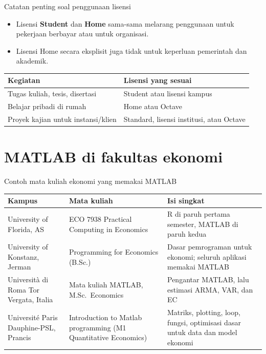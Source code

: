 \documentclass[aspectratio=169,11pt]{beamer}
\begin{document}
\begin{frame}{Catatan penting soal penggunaan lisensi}
\begin{itemize}
  \item Lisensi \textbf{Student} dan \textbf{Home} sama-sama
        \alert{melarang} penggunaan untuk pekerjaan berbayar atau untuk
        organisasi.
  \item Lisensi Home secara eksplisit juga tidak untuk keperluan
        pemerintah dan akademik.
\end{itemize}
\vspace{0.6em}
\centering\small
\renewcommand{\arraystretch}{1.2}
\begin{tabular}{l l}
\toprule
Kegiatan & Lisensi yang sesuai \\
\midrule
Tugas kuliah, tesis, disertasi & Student atau lisensi kampus \\
Belajar pribadi di rumah & Home atau Octave \\
Proyek kajian untuk instansi/klien & Standard, lisensi institusi, atau Octave \\
\bottomrule
\end{tabular}
\end{frame}

\section{MATLAB di fakultas ekonomi}

\begin{frame}{Contoh mata kuliah ekonomi yang memakai MATLAB}
\footnotesize
\renewcommand{\arraystretch}{1.25}
\begin{tabular}{L{2.9cm} L{4.1cm} L{5.4cm}}
\toprule
Kampus & Mata kuliah & Isi singkat \\
\midrule
University of Florida, AS &
ECO 7938 Practical Computing in Economics &
R di paruh pertama semester, MATLAB di paruh kedua \\
University of Konstanz, Jerman &
Programming for Economics (B.Sc.) &
Dasar pemrograman untuk ekonomi; seluruh aplikasi memakai MATLAB \\
Università di Roma Tor Vergata, Italia &
Mata kuliah MATLAB, M.Sc.\ Economics &
Pengantar MATLAB, lalu estimasi ARMA, VAR, dan EC \\
Université Paris Dauphine-PSL, Prancis &
Introduction to Matlab programming (M1 Quantitative Economics) &
Matriks, plotting, loop, fungsi, optimisasi dasar untuk data dan model ekonomi \\
\bottomrule
\end{tabular}
\end{frame}
\end{document}
